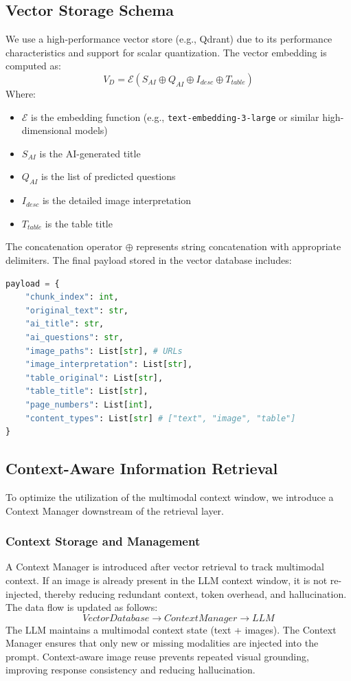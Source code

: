 \documentclass[conference]{IEEEtran}
\begin{document}
\subsection{Vector Storage Schema}
We use a high-performance vector store (e.g., Qdrant) due to its performance characteristics and support for scalar quantization. The vector embedding is computed as:
\begin{equation}
V_D = \mathcal{E}\left( S_{AI} \oplus Q_{AI} \oplus I_{desc} \oplus T_{table} \right)
\end{equation}
Where:
\begin{itemize}
    \item $\mathcal{E}$ is the embedding function (e.g., \texttt{text-embedding-3-large} or similar high-dimensional models)
    \item $S_{AI}$ is the AI-generated title
    \item $Q_{AI}$ is the list of predicted questions
    \item $I_{desc}$ is the detailed image interpretation
    \item $T_{table}$ is the table title
\end{itemize}
The concatenation operator $\oplus$ represents string concatenation with appropriate delimiters. The final payload stored in the vector database includes:
\begin{lstlisting}[language=Python, caption=Vector Payload Structure]
payload = {
    "chunk_index": int,
    "original_text": str,
    "ai_title": str,
    "ai_questions": str,
    "image_paths": List[str], # URLs
    "image_interpretation": List[str],
    "table_original": List[str],
    "table_title": List[str],
    "page_numbers": List[int],
    "content_types": List[str] # ["text", "image", "table"]
}
\end{lstlisting}

\subsection{Context-Aware Information Retrieval}
To optimize the utilization of the multimodal context window, we introduce a Context Manager downstream of the retrieval layer.
\subsubsection{Context Storage and Management}
A Context Manager is introduced after vector retrieval to track multimodal context. If an image is already present in the LLM context window, it is not re-injected, thereby reducing redundant context, token overhead, and hallucination. The data flow is updated as follows:
\begin{equation}
Vector Database \rightarrow Context Manager \rightarrow LLM
\end{equation}
The LLM maintains a multimodal context state (text + images). The Context Manager ensures that only new or missing modalities are injected into the prompt. Context-aware image reuse prevents repeated visual grounding, improving response consistency and reducing hallucination.
\end{document}
